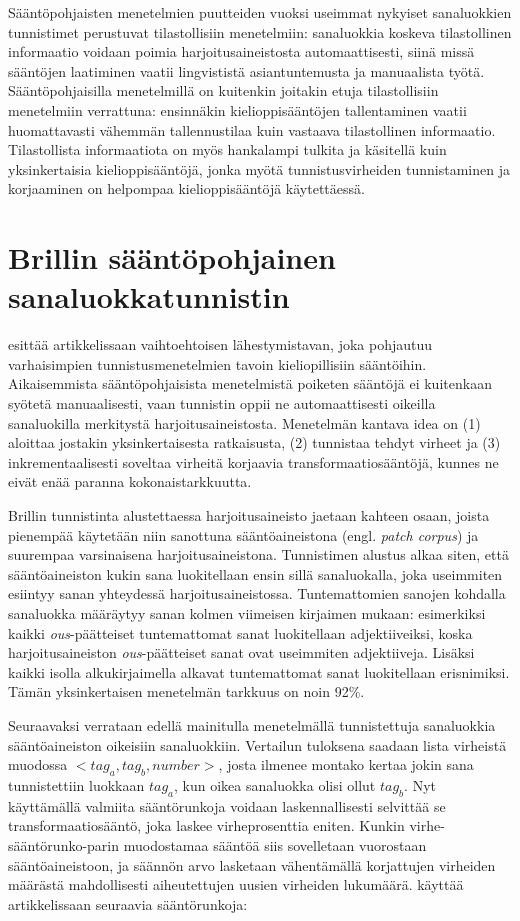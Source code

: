 \documentclass[utf8,bachelor,manualbib]{gradu3}
\begin{document}
Sääntöpohjaisten menetelmien puutteiden vuoksi useimmat nykyiset sanaluokkien tunnistimet perustuvat tilastollisiin menetelmiin: sanaluokkia koskeva tilastollinen informaatio voidaan poimia harjoitusaineistosta automaattisesti, siinä missä sääntöjen laatiminen vaatii lingvististä asiantuntemusta ja manuaalista työtä. Sääntöpohjaisilla menetelmillä on kuitenkin joitakin etuja tilastollisiin menetelmiin verrattuna: ensinnäkin kielioppisääntöjen tallentaminen vaatii huomattavasti vähemmän tallennustilaa kuin vastaava tilastollinen informaatio. Tilastollista informaatiota on myös hankalampi tulkita ja käsitellä kuin yksinkertaisia kielioppisääntöjä, jonka myötä tunnistusvirheiden tunnistaminen ja korjaaminen on helpompaa kielioppisääntöjä käytettäessä. \citep{brill1992}

\section{Brillin sääntöpohjainen sanaluokkatunnistin}

\citet{brill1992} esittää artikkelissaan vaihtoehtoisen lähestymistavan, joka pohjautuu varhaisimpien tunnistusmenetelmien tavoin kieliopillisiin sääntöihin. Aikaisemmista sääntöpohjaisista menetelmistä poiketen sääntöjä ei kuitenkaan syötetä manuaalisesti, vaan tunnistin oppii ne automaattisesti oikeilla sanaluokilla merkitystä harjoitusaineistosta. Menetelmän kantava idea on (1) aloittaa jostakin yksinkertaisesta ratkaisusta, (2) tunnistaa tehdyt virheet ja (3) inkrementaalisesti soveltaa virheitä korjaavia transformaatiosääntöjä, kunnes ne eivät enää paranna kokonaistarkkuutta.

Brillin tunnistinta alustettaessa harjoitusaineisto jaetaan kahteen osaan, joista pienempää käytetään niin sanottuna sääntöaineistona (engl. \textit{patch corpus}) ja suurempaa varsinaisena harjoitusaineistona. Tunnistimen alustus alkaa siten, että sääntöaineiston kukin sana luokitellaan ensin sillä sanaluokalla, joka useimmiten esiintyy sanan yhteydessä harjoitusaineistossa. Tuntemattomien sanojen kohdalla sanaluokka määräytyy sanan kolmen viimeisen kirjaimen mukaan: esimerkiksi kaikki \textit{ous}-päätteiset tuntemattomat sanat luokitellaan adjektiiveiksi, koska harjoitusaineiston \textit{ous}-päätteiset sanat ovat useimmiten adjektiiveja. Lisäksi kaikki isolla alkukirjaimella alkavat tuntemattomat sanat luokitellaan erisnimiksi. Tämän yksinkertaisen menetelmän tarkkuus on noin 92\%. \citep{brill1992}

Seuraavaksi verrataan edellä mainitulla menetelmällä tunnistettuja sanaluokkia sääntöaineiston oikeisiin sanaluokkiin. Vertailun tuloksena saadaan lista virheistä muodossa $<tag_a, tag_b, number>$, josta ilmenee montako kertaa jokin sana tunnistettiin luokkaan $tag_a$, kun oikea sanaluokka olisi ollut $tag_b$. Nyt käyttämällä valmiita sääntörunkoja voidaan laskennallisesti selvittää se transformaatiosääntö, joka laskee virheprosenttia eniten. Kunkin virhe-sääntörunko-parin muodostamaa sääntöä siis sovelletaan vuorostaan sääntöaineistoon, ja säännön arvo lasketaan vähentämällä korjattujen virheiden määrästä mahdollisesti aiheutettujen uusien virheiden lukumäärä. \citet{brill1992} käyttää artikkelissaan seuraavia sääntörunkoja:
\end{document}
